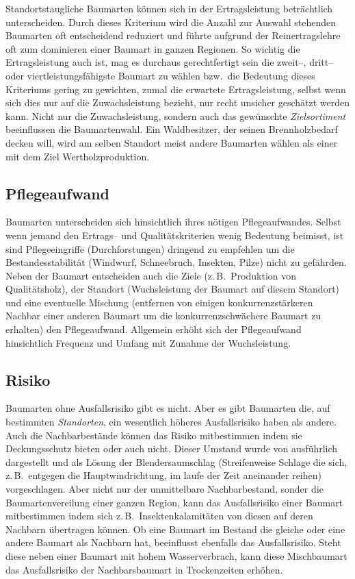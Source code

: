 \documentclass[twocolumn]{scrartcl}
\begin{document}
Standortstaugliche Baumarten können sich in der Ertragsleistung
beträchtlich unterscheiden. Durch dieses Kriterium wird die Anzahl zur
Auswahl stehenden Baumarten oft entscheidend reduziert und führte
aufgrund der Reinertragslehre oft zum dominieren einer Baumart in
ganzen Regionen. So wichtig die Ertragsleistung auch ist, mag es
durchaus gerechtfertigt sein die zweit--, dritt-- oder
viertleistungsfähigste Baumart zu wählen bzw.\ die Bedeutung dieses
Kriteriums gering zu gewichten, zumal die erwartete Ertragsleistung,
selbst wenn sich dies nur auf die Zuwachsleistung bezieht, nur recht
unsicher geschätzt werden kann. Nicht nur die Zuwachsleistung, sondern
auch das gewünschte \emph{Zielsortiment} beeinflussen die
Baumartenwahl. Ein Waldbesitzer, der seinen Brennholzbedarf decken
will, wird am selben Standort meist andere Baumarten wählen als einer
mit dem Ziel Wertholzproduktion.

\subsection{Pflegeaufwand}
\label{ssec:pflegeaufwand}

Baumarten unterscheiden sich hinsichtlich ihres nötigen
Pflegeaufwandes. Selbst wenn jemand den Ertrags-- und
Qualitätskriterien wenig Bedeutung beimisst, ist sind Pflegeeingriffe
(Durchforstungen) dringend zu empfehlen um die Bestandesstabilität
(Windwurf, Schneebruch, Insekten, Pilze) nicht zu gefährden. Neben der
Baumart entscheiden auch die Ziele (z.\,B.\ Produktion von
Qualitätsholz), der Standort (Wuchsleistung der Baumart auf diesem
Standort) und eine eventuelle Mischung (entfernen von einigen
konkurrenzstärkeren Nachbar einer anderen Baumart um die
konkurrenzschwächere Baumart zu erhalten) den Pflegeaufwand. Allgemein
erhöht sich der Pflegeaufwand hinsichtlich Frequenz und Umfang mit
Zunahme der Wuchsleistung.

\subsection{Risiko}
\label{ssec:risiko}

Baumarten ohne Ausfallsrisiko gibt es nicht. Aber es gibt Baumarten
die, auf bestimmten \emph{Standorten}, ein wesentlich höheres
Ausfallsrisiko haben als andere. Auch die Nachbarbestände können das
Risiko mitbestimmen indem sie Deckungsschutz bieten oder auch
nicht. Dieser Umstand wurde von
\cite{wagner1923DerBlendersaumschlagUndSeinSystem} ausführlich
dargestellt und als Lösung der Blendersaumschlag (Streifenweise
Schlage die sich, z.\,B.\ entgegen die Hauptwindrichtung, im laufe der
Zeit aneinander reihen) vorgeschlagen. Aber nicht nur der unmittelbare
Nachbarbestand, sonder die Baumartenvereilung einer ganzen Region,
kann das Ausfallsrisiko einer Baumart mitbestimmen indem sich z.\,B.\
Insektenkalamitäten von diesen auf deren Nachbarn übertragen
können. Ob eine Baumart im Bestand die gleiche oder eine andere
Baumart als Nachbarn hat, beeinflusst ebenfalls das
Ausfallsrisiko. Steht diese neben einer Baumart mit hohem
Wasserverbrach, kann diese Mischbaumart das Ausfallsrisiko der
Nachbarsbaumart in Trockenzeiten erhöhen.
\end{document}
